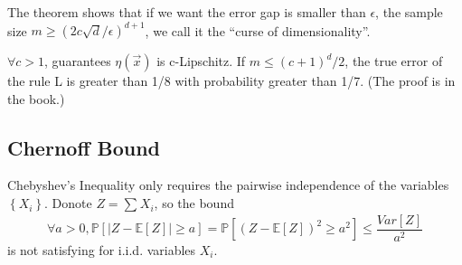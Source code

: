 The theorem shows that if we want the error gap is smaller than $ \epsilon $, the sample size $ m \ge {(2c \sqrt{d} /\epsilon)}^{d+1} $, we call it the ``curse of dimensionality''.

$ \forall c > 1 $, guarantees $ \eta(\vec{x}) $ is c-Lipschitz. If $ m \le {(c+1)}^d /2 $, the true error of the rule L is greater than 1/8 with probability greater than 1/7. (The proof is in the book.)

\subsection{Chernoff Bound}%
\label{sub:chernoff_bound}

Chebyshev's Inequality only requires the pairwise independence of the variables $ \left\{ X_i \right\} $. Donote $ Z = \sum^{}_{} X_i $, so the bound
\[
    \forall a > 0, \mathbb{P} \left[ \left| Z - \mathbb{E} \left[ Z \right] \right| \ge a \right]
    = \mathbb{P} \left[ {(Z - \mathbb{E}\left[ Z \right])}^2 \ge a^2 \right] \le \frac{Var\left[ Z \right]}{a^2} 
\]
is not satisfying for {i.i.d.} variables $ {X_i} $.

